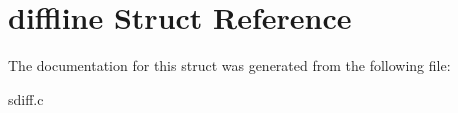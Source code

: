 \hypertarget{structdiffline}{
\section{diffline Struct Reference}
\label{structdiffline}
}


The documentation for this struct was generated from the following file:\begin{DoxyCompactItemize}
\item 
sdiff.c\end{DoxyCompactItemize}
